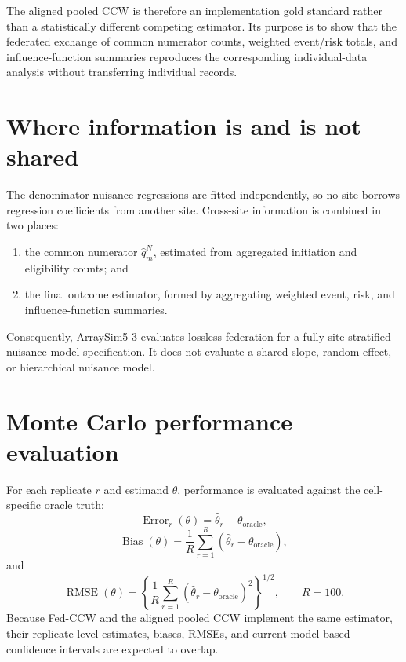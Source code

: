 \documentclass[11pt]{article}
\begin{document}
The aligned pooled CCW is therefore an implementation gold standard rather
than a statistically different competing estimator. Its purpose is to show
that the federated exchange of common numerator counts, weighted event/risk
totals, and influence-function summaries reproduces the corresponding
individual-data analysis without transferring individual records.

\section{Where information is and is not shared}

The denominator nuisance regressions are fitted independently, so no site
borrows regression coefficients from another site. Cross-site information is
combined in two places:
\begin{enumerate}[leftmargin=2em]
  \item the common numerator $\widehat q_m^N$, estimated from aggregated
        initiation and eligibility counts; and
  \item the final outcome estimator, formed by aggregating weighted event,
        risk, and influence-function summaries.
\end{enumerate}
Consequently, ArraySim5-3 evaluates lossless federation for a fully
site-stratified nuisance-model specification. It does not evaluate a shared
slope, random-effect, or hierarchical nuisance model.

\section{Monte Carlo performance evaluation}

For each replicate $r$ and estimand $\theta$, performance is evaluated against
the cell-specific oracle truth:
\[
  \operatorname{Error}_r(\theta)=\widehat\theta_r-\theta_{\mathrm{oracle}},
\]
\[
  \operatorname{Bias}(\theta)
  =\frac{1}{R}\sum_{r=1}^R
    \left(\widehat\theta_r-\theta_{\mathrm{oracle}}\right),
\]
and
\[
  \operatorname{RMSE}(\theta)
  =\left\{
      \frac{1}{R}\sum_{r=1}^R
      \left(\widehat\theta_r-\theta_{\mathrm{oracle}}\right)^2
    \right\}^{1/2},
  \qquad R=100.
\]
Because Fed-CCW and the aligned pooled CCW implement the same estimator, their
replicate-level estimates, biases, RMSEs, and current model-based confidence
intervals are expected to overlap.
\end{document}
